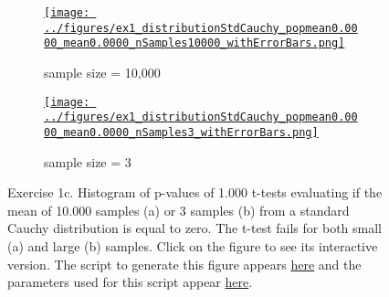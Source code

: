 \documentclass[12pt]{article}
\def\fig_width{3.5in}
\begin{document}
\begin{enumerate}[(a)]
        \begin{figure}[H]
            \begin{center}

                \begin{subfigure}{1.0\textwidth}
                    \centering
                    \href{https://www.gatsby.ucl.ac.uk/~rapela/neuroinformatics/2023/ws1/figures/ex1_distributionStdCauchy_popmean0.0000_mean0.0000_nSamples10000_withErrorBars.html}{\texttt{[image: ../figures/ex1\_distributionStdCauchy\_popmean0.0000\_mean0.0000\_nSamples10000\_withErrorBars.png]}}

                    \caption{sample size = 10,000}

                    \label{fig:ex1c_1}
                \end{subfigure}

                \begin{subfigure}{1.0\textwidth}
                    \centering
                    \href{https://www.gatsby.ucl.ac.uk/~rapela/neuroinformatics/2023/ws1/figures/ex1_distributionStdCauchy_popmean0.0000_mean0.0000_nSamples3_withErrorBars.html}{\texttt{[image: ../figures/ex1\_distributionStdCauchy\_popmean0.0000\_mean0.0000\_nSamples3\_withErrorBars.png]}}

                    \caption{sample size = 3}

                    \label{fig:ex1c_2}
                \end{subfigure}

                \caption{Exercise 1c. Histogram of p-values of 1.000 t-tests
                evaluating if the mean of 10.000 samples (a) or 3 samples
                (b) from a standard Cauchy distribution is equal to zero. The
                t-test fails for both small (a) and large (b)
                samples. Click on the figure to see its interactive version.
                The script to generate this figure appears
                \href{https://github.com/joacorapela/neuroinformatics23/blob/master/worksheets/ws1/mySolution/code/scripts/doEx1WithErrorBars.py}{here} and the
                parameters used for this script appear
                \href{https://github.com/joacorapela/neuroinformatics23/blob/master/worksheets/ws1/mySolution/code/scripts/doEx1cWithErrorBars.csh}{here}.}
                \label{fig:ex1c}

            \end{center}
        \end{figure}


\end{enumerate}
\end{document}
